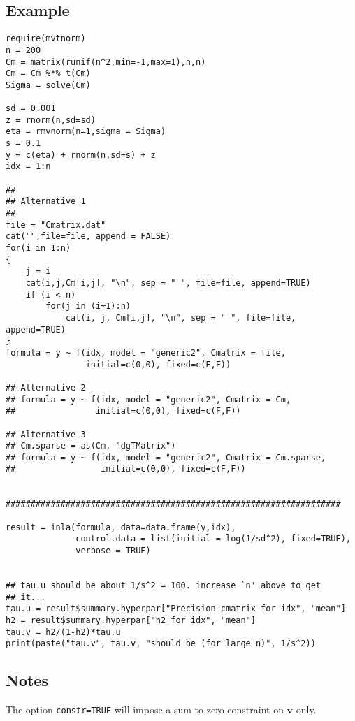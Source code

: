 \documentclass[a4paper,11pt]{article}
\def\mm#1{\ensuremath{\boldsymbol{#1}}} %
\begin{document}
\subsection*{Example}
{\small\begin{verbatim}
require(mvtnorm)
n = 200
Cm = matrix(runif(n^2,min=-1,max=1),n,n)
Cm = Cm %*% t(Cm)
Sigma = solve(Cm)

sd = 0.001
z = rnorm(n,sd=sd)
eta = rmvnorm(n=1,sigma = Sigma)
s = 0.1
y = c(eta) + rnorm(n,sd=s) + z
idx = 1:n

##
## Alternative 1
##
file = "Cmatrix.dat"
cat("",file=file, append = FALSE)
for(i in 1:n)
{
    j = i
    cat(i,j,Cm[i,j], "\n", sep = " ", file=file, append=TRUE)
    if (i < n)
        for(j in (i+1):n)
            cat(i, j, Cm[i,j], "\n", sep = " ", file=file, append=TRUE)
}
formula = y ~ f(idx, model = "generic2", Cmatrix = file,
                initial=c(0,0), fixed=c(F,F))

## Alternative 2
## formula = y ~ f(idx, model = "generic2", Cmatrix = Cm,
##                initial=c(0,0), fixed=c(F,F))

## Alternative 3
## Cm.sparse = as(Cm, "dgTMatrix")
## formula = y ~ f(idx, model = "generic2", Cmatrix = Cm.sparse,
##                 initial=c(0,0), fixed=c(F,F))


###################################################################

result = inla(formula, data=data.frame(y,idx),
              control.data = list(initial = log(1/sd^2), fixed=TRUE),
              verbose = TRUE)


## tau.u should be about 1/s^2 = 100. increase `n' above to get
## it...
tau.u = result$summary.hyperpar["Precision-cmatrix for idx", "mean"]
h2 = result$summary.hyperpar["h2 for idx", "mean"]
tau.v = h2/(1-h2)*tau.u
print(paste("tau.v", tau.v, "should be (for large n)", 1/s^2))
\end{verbatim}}

\subsection*{Notes}

The option \texttt{constr=TRUE} will impose a sum-to-zero constraint
on $\mm{v}$ only.
\end{document}
